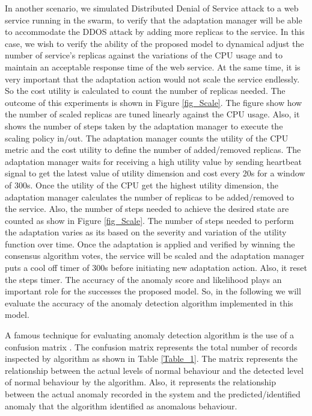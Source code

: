 \documentclass[sigconf]{acmart}
\begin{document}
In another scenario, we simulated Distributed Denial of Service attack to a web service running in the swarm, to verify that the adaptation manager will be able to accommodate the DDOS attack by adding more replicas to the service. In this case, we wish to verify the ability of the proposed model to dynamical adjust the number of service's replicas against the variations of the CPU usage and to maintain an acceptable response time of the web service. At the same time, it is very important that the adaptation action would not scale the service endlessly. So the cost utility is calculated to count the number of replicas needed. The outcome of this experiments is shown in Figure \ref{fig_Scale}. The figure show how the number of scaled replicas are tuned linearly against the CPU usage. Also, it shows the number of steps taken by the adaptation manager to execute the scaling policy in/out. The adaptation manager counts the utility of the CPU metric and the cost utility to define the number of added/removed replicas. The adaptation manager waits for receiving a high utility value by sending heartbeat signal to get the latest value of utility dimension and cost every 20s for a window of 300s. Once the utility of the CPU get the highest utility dimension, the adaptation manager calculates the number of replicas to be added/removed to the service. Also, the number of steps needed to achieve the desired state are counted as show in Figure \ref{fig_Scale}. The number of steps needed to perform the adaptation varies as its based on the severity and variation of the utility function over time. Once the adaptation is applied and verified by winning the consensus algorithm votes, the service will be scaled and the adaptation manager puts a cool off timer of 300s before initiating new adaptation action. Also, it reset the steps timer. The accuracy of the anomaly score and likelihood plays an important role for the successes the proposed model. So, in the following we will evaluate the accuracy of the anomaly detection algorithm implemented in this model.

A famous technique for evaluating anomaly detection algorithm is the use of a confusion matrix \cite{kohavi1998confusion}. The confusion matrix represents the total number of records inspected by algorithm as shown in Table \ref{Table_1}. The matrix represents the relationship between the actual levels of normal behaviour and the detected level of normal behaviour by the algorithm. Also, it represents the relationship between the actual anomaly recorded in the system and the predicted/identified anomaly that the algorithm identified as anomalous behaviour.   
\end{document}
